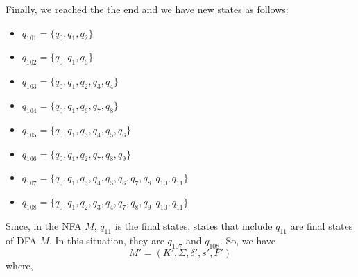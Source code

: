 Finally, we reached the the end and we have new states as follows:
\begin{multicols}{2}
\begin{itemize}
    \item $q_{101} = \{ q_{0}, q_{1}, q_{2} \}$
    \item $q_{102} = \{ q_{0}, q_{1}, q_{6} \}$
    \item $q_{103} = \{ q_{0}, q_{1}, q_{2}, q_{3}, q_{4} \}$
    \item $q_{104} = \{ q_{0}, q_{1}, q_{6}, q_{7}, q_{8} \}$
    \item $q_{105} = \{ q_{0}, q_{1}, q_{3}, q_{4}, q_{5}, q_{6} \}$
    \item $q_{106} = \{ q_{0}, q_{1}, q_{2}, q_{7}, q_{8}, q_{9} \}$
    \item $q_{107} = \{ q_{0}, q_{1}, q_{3}, q_{4}, q_{5}, q_{6}, q_{7}, q_{8}, q_{10}, q_{11} \}$
    \item $q_{108} = \{ q_{0}, q_{1}, q_{2}, q_{3}, q_{4}, q_{7}, q_{8}, q_{9}, q_{10}, q_{11} \}$
\end{itemize}
\end{multicols}
Since, in the NFA $M$, $q_{11}$ is the final states, states that include $q_{11}$ are final states of DFA $M$. In this situation, they are $q_{107}$ and $q_{108}$. So, we have
\begin{equation*}
    M' = (K', \Sigma, \delta', s', F')
\end{equation*}
where,
